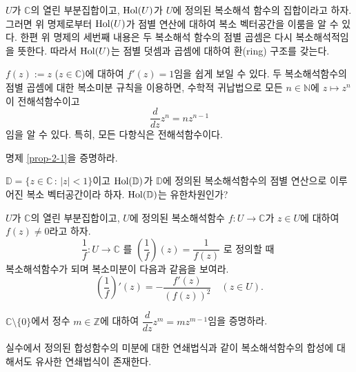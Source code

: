 \begin{salt_remark}\label{remark-2-1}
$U$가 $\mathbb C$의 열린 부분집합이고,
$\mathop{\mathrm{Hol}}(U)$가 $U$에 정의된 복소해석 함수의 집합이라고 하자.
그러면 위 명제로부터 $\mathop{\mathrm{Hol}}(U)$가 점별 연산에 대하여 복소 벡터공간을 이룸을 알 수 있다.
한편 위 명제의 세번째 내용은 두 복소해석 함수의 점별 곱셈은 다시 복소해석적임을 뜻한다.
따라서 $\mathop{\mathrm{Hol}}(U)$는 점별 덧셈과 곱셈에 대하여
환(ring) 구조를 갖는다.
\end{salt_remark}

\begin{saltexample}{}{} \label{example-2-3}
$f(z):=z$ ($z\in \mathbb C$)에 대하여 $f'(z)=1$임을 쉽게 보일 수 있다.
두 복소해석함수의 점별 곱셈에 대한 복소미분 규칙을 이용하면,
수학적 귀납법으로 모든 $n\in \mathbb N$에 $z\mapsto z^n$이 전해석함수이고
\[
\dfrac{d}{dz} z^n = nz^{n-1}
\]
임을 알 수 있다.
특히, 모든 다항식은 전해석함수이다.
\end{saltexample}

\begin{salt_exercise} \label{ex-2-4}
명제 \ref{prop-2-1}을 증명하라.
\end{salt_exercise}


\begin{salt_exercise} \label{ex-2-5}
$\mathbb D = \{ z\in\mathbb C \,:\, |z|<1 \}$이고
$\mathop{\mathrm{Hol}}(\mathbb D)$가 $\mathbb D$에 정의된 복소해석함수의 점별 연산으로 이루어진
복소 벡터공간이라 하자.  $\mathop{\mathrm{Hol}}(\mathbb D)$는 유한차원인가?
\end{salt_exercise}


\begin{salt_exercise} \label{ex-2-6}
$U$가 $\mathbb C$의 열린 부분집합이고,
$U$에 정의된 복소해석함수 $f:U\to \mathbb C$가 
$z\in U$에 대하여 $f(z)\ne 0$라고 하자.
\[
\dfrac 1f : U \to \mathbb C \text{ 를 }
\left( \dfrac 1f \right) (z) = \dfrac 1{f(z)} \text{ 로 정의할 때 }
\]
복소해석함수가 되며 복소미분이 다음과 같음을 보여라.
\[
\left( \dfrac 1f \right)' (z) = - \dfrac{f'(z)}{(f(z))^2} \quad (z\in U).
\]
\end{salt_exercise}

\begin{salt_exercise} \label{ex-2-7}
$\mathbb C\setminus \{0\}$에서 정수 $m\in\mathbb Z$에 대하여
$\dfrac d{dz} z^m = mz^{m-1}$임을 증명하라.
\end{salt_exercise}

실수에서 정의된 합성함수의 미분에 대한 연쇄법식과 같이
복소해석함수의 합성에 대해서도 유사한 연쇄법식이 존재한다.

